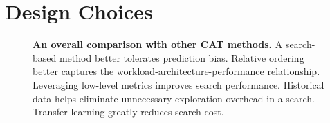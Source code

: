 \section{Design Choices}
\label{sec:design}

\begin{figure}
    \centering
    \caption{
    \small{
    \textbf{An overall comparison with other CAT methods.}
    A search-based method better tolerates prediction bias.
    Relative ordering better captures the workload-architecture-performance relationship.
    Leveraging low-level metrics improves search performance.
    Historical data helps eliminate unnecessary exploration overhead in a search.
    Transfer learning greatly reduces search cost.}
    }
    \label{fig:model_classification}
\end{figure}



